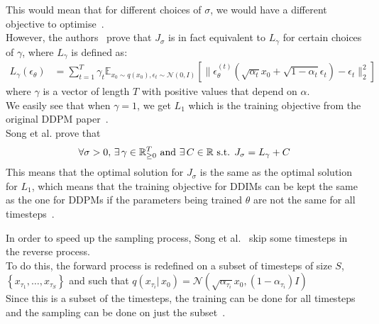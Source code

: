 \documentclass{article}
\numberwithin{equation}{section}
\numberwithin{figure}{section}
\begin{document}
This would mean that for different choices of $\sigma$, we would have a different objective to optimise~\cite{song2022denoising}. \\
However, the authors~\cite{song2022denoising} prove that $J_\sigma$ is in fact equivalent to $L_\gamma$ for certain choices of $\gamma$, where $L_\gamma$ is defined as:
\begin{align}
  L_\gamma (\epsilon_\theta) &= \sum_{t=1}^{T} \gamma_t \mathbb{E}_{x_0 \sim q(x_0), \epsilon_t \sim \mathcal{N}(0, I)}  \left[ \| \epsilon_\theta^{(t)} (\sqrt{\alpha_t} x_0 + \sqrt{1 - \alpha_t} \epsilon_t) - \epsilon_t \|_2^2 \right]
\end{align}
where $\gamma$ is a vector of length $T$ with positive values that depend on $\alpha$. \\
We easily see that when $\gamma = 1$, we get $L_1$ which is the training objective from the original DDPM paper~\cite{ho2020denoising, song2022denoising}. \\
Song et al. prove that
\begin{align}
  \forall \sigma > 0, \, \exists \, \gamma \in \mathbb{R}_{\geq 0}^T \text{ and } \exists \, C \in \mathbb{R} \text{ s.t. } J_\sigma = L_\gamma + C \notag
\end{align}
This means that the optimal solution for $J_\sigma$ is the same as the optimal solution for $L_1$, which means that the training objective for DDIMs can be kept the same as the one for DDPMs if the parameters being trained $\theta$ are not the same for all timesteps~\cite{song2022denoising}.

In order to speed up the sampling process, Song et al.~\cite{song2022denoising} skip some timesteps in the reverse process. \\
To do this, the forward process is redefined on a subset of timesteps of size $S$, $\left\{ x_{\tau_1}, \dots, x_{\tau_S} \right\}$ and such that $q(x_{\tau_i} | \, x_0) = \mathcal{N}(\sqrt{\alpha_{\tau_i}} x_0, (1 - \alpha_{\tau_i})I)$ \\
Since this is a subset of the timesteps, the training can be done for all timesteps and the sampling can be done on just the subset~\cite{song2022denoising}.
\end{document}
